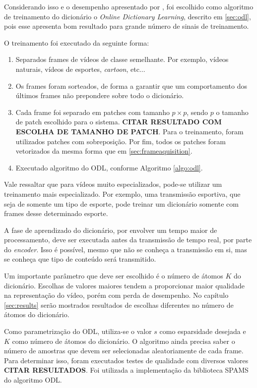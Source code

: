 \documentclass[cic,tc]{iiufrgs}
\begin{document}
Considerando isso e o desempenho apresentado por \citet{MairalOnlineDictLearn}, foi escolhido
como algoritmo de treinamento do dicionário o \textit{Online Dictionary Learning},
descrito em \autoref{sec:odl},
pois esse apresenta bom resultado para grande número de sinais de treinamento.

O treinamento foi executado da seguinte forma:
\begin{enumerate}
    \item Separados frames de vídeos de classe semelhante. Por exemplo, vídeos naturais, vídeos
    de esportes, \textit{cartoon}, etc...
    \item Os frames foram sorteados, de forma a garantir que um comportamento dos últimos frames
    não prepondere sobre todo o dicionário.
    \item Cada frame foi separado em patches com tamanho $p \times p$, sendo $p$ o tamanho de
    patch escolhido para o sistema. \textbf{CITAR RESULTADO COM ESCOLHA DE TAMANHO DE PATCH}.
    Para o treinamento, foram utilizados patches com sobreposição. Por fim, todos os patches
    foram vetorizados da mesma forma que em \autoref{sec:frameaquisition}.
    \item Executado algoritmo do ODL, conforme Algoritmo \autoref{algo:odl}.
\end{enumerate}

Vale ressaltar que para vídeos muito especializados, pode-se utilizar um treinamento
mais especializado. Por exemplo, uma transmissão esportiva, que seja de somente um tipo
de esporte, pode treinar um dicionário somente com frames desse determinado esporte.

A fase de aprendizado do dicionário, por envolver um tempo maior de processamento,
deve ser executada antes da transmissão de tempo real, por parte do \textit{encoder}.
Isso é possível, mesmo que não
se conheça a transmissão em si, mas se conheça que tipo de conteúdo será transmitido.

Um importante parâmetro que deve ser escolhido é o número de átomos $K$ do dicionário.
Escolhas de valores maiores tendem a proporcionar maior qualidade na representação do vídeo,
porém com perda de desempenho. No capítulo \autoref{sec:results} serão mostrados resultados
de escolhas diferentes no número de átomos do dicionário.

Como parametrização do ODL, utiliza-se o valor $s$ como esparsidade desejada e
$K$ como número de átomos do dicionário.
O algoritmo ainda precisa saber o número de amostras que devem ser selecionadas aleatoriamente
de cada frame.
Para determinar isso, foram executados testes de qualidade com diversos valores
\textbf{CITAR RESULTADOS}.
Foi utilizada a implementação da biblioteca SPAMS \cite{SPAMS} do algoritmo ODL.
\end{document}
